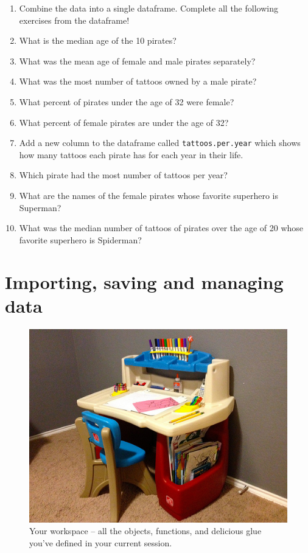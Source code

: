 \documentclass[]{book}
\theoremstyle{definition}
\theoremstyle{definition}
\theoremstyle{remark}
\begin{document}
\begin{enumerate}
\def\labelenumi{\arabic{enumi}.}
\item
  Combine the data into a single dataframe. Complete all the following
  exercises from the dataframe!
\item
  What is the median age of the 10 pirates?
\item
  What was the mean age of female and male pirates separately?
\item
  What was the most number of tattoos owned by a male pirate?
\item
  What percent of pirates under the age of 32 were female?
\item
  What percent of female pirates are under the age of 32?
\item
  Add a new column to the dataframe called \texttt{tattoos.per.year}
  which shows how many tattoos each pirate has for each year in their
  life.
\item
  Which pirate had the most number of tattoos per year?
\item
  What are the names of the female pirates whose favorite superhero is
  Superman?
\item
  What was the median number of tattoos of pirates over the age of 20
  whose favorite superhero is Spiderman?
\end{enumerate}

\chapter{Importing, saving and managing data}\label{importingdata}

\begin{figure}

{\centering \includegraphics[width=0.75\linewidth]{images/workspace} 

}

\caption{Your workspace -- all the objects, functions, and delicious glue you've defined in your current session.}\label{fig:workspace}
\end{figure}
\end{document}
